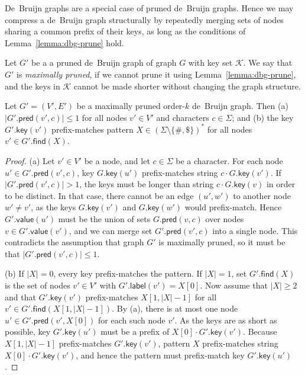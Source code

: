 \documentclass[a4paper,UKenglish]{lipics-v2016}
\newcommand{\set}[1]{\ensuremath{\{ #1 \}}}
\newcommand{\abs}[1]{\ensuremath{\lvert #1 \rvert}}
\newcommand{\find}{\ensuremath{\mathsf{find}}}
\newcommand{\glabel}{\ensuremath{\mathsf{label}}}
\newcommand{\gpred}{\ensuremath{\mathsf{pred}}}
\newcommand{\gkey}{\ensuremath{\mathsf{key}}}
\newcommand{\gvalue}{\ensuremath{\mathsf{value}}}
\newcommand{\orderk}[1]{order\nobreakdash-$#1$}
\begin{document}
De~Bruijn graphs are a special case of pruned de~Bruijn graphs. Hence we may compress a de~Bruijn graph structurally by repeatedly merging sets of nodes sharing a common prefix of their keys, as long as the conditions of Lemma~\ref{lemma:dbg-prune} hold.

\begin{definition}
Let $G'$ be a a pruned de~Bruijn graph of graph $G$ with key set $\mathcal{K}$. We say that $G'$ is \emph{maximally pruned}, if we cannot prune it using Lemma~\ref{lemma:dbg-prune}, and the keys in $\mathcal{K}$ cannot be made shorter without changing the graph structure.
\end{definition}

\begin{lemma}\label{lemma:dbg-maximal}
Let $G' = (V', E')$ be a maximally pruned \orderk{k} de~Bruijn graph. Then (a) $\abs{G'.\gpred(v', c)} \le 1$ for all nodes $v' \in V'$ and characters $c \in \Sigma$; and (b) the key $G'.\gkey(v')$ prefix-matches pattern $X \in (\Sigma \setminus \set{\#, \$})^{\ast}$ for all nodes $v' \in G'.\find(X)$.
\end{lemma}

\begin{proof}
(a) Let $v' \in V'$ be a node, and let $c \in \Sigma$ be a character. For each node $u' \in G'.\gpred(v', c)$, key $G.\gkey(u')$ prefix-matches string $c \cdot G.\gkey(v')$. If $\abs{G'.\gpred(v', c)} > 1$, the keys must be longer than string $c \cdot G.\gkey(v)$ in order to be distinct. In that case, there cannot be an edge $(u', w')$ to another node $w' \ne v'$, as the keys $G.\gkey(v')$ and $G.\gkey(w')$ would prefix-match. Hence $G'.\gvalue(u')$ must be the union of sets $G.\gpred(v, c)$ over nodes $v \in G'.\gvalue(v')$, and we can merge set $G'.\gpred(v', c)$ into a single node. This contradicts the assumption that graph $G'$ is maximally pruned, so it must be that $\abs{G'.\gpred(v', c)} \le 1$.

(b) If $\abs{X} = 0$, every key prefix-matches the pattern. If $\abs{X} = 1$, set $G'.\find(X)$ is the set of nodes $v' \in V'$ with $G'.\glabel(v') = X[0]$. Now assume that $\abs{X} \ge 2$ and that $G'.\gkey(v')$ prefix-matches $X[1, \abs{X}-1]$ for all $v' \in G'.\find(X[1, \abs{X}-1])$. By (a), there is at most one node $u' \in G'.\gpred(v', X[0])$ for each such node $v'$. As the keys are as short as possible, key $G'.\gkey(u')$ must be a prefix of $X[0] \cdot G'.\gkey(v')$. Because $X[1, \abs{X}-1]$ prefix-matches $G'.\gkey(v')$, pattern $X$ prefix-matches string $X[0] \cdot G'.\gkey(v')$, and hence the pattern must prefix-match key $G'.\gkey(u')$.
\end{proof}
\end{document}
